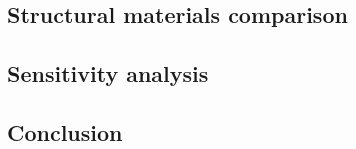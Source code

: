 \subsection{Structural materials comparison}\label{sec:strucmat}


\subsection{Sensitivity analysis}\label{sec:strucsens}

\subsection{Conclusion}\label{sec:strucconc}

